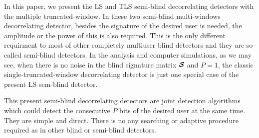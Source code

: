 \documentclass[a4paper,11pt,fleqn]{article}
\newcommand{\bcS}{{\mbox {\boldmath ${\cal S}$}}}
\begin{document}
In this paper, we present the LS and TLS semi-blind decorrelating
detectors with the multiple truncated-window. In these two
semi-blind multi-windows decorrelating detector, besides the
signature of the desired user is needed, the amplitude or the
power of this is also required. This is the only different
requirment to most of other completely multiuser blind detectors
and they are so-called semi-blind detectors. In the analysis and
computer simulations, as we may see, when there is no noise in the
blind signature matrix $\bcS$ and $P=1$, the classic
single-truncated-window decorrelating detector is just one special
case of the present LS sem-blind detector.

This present semi-blind decorrelating detectors are joint
detection algorithms which could detect the consecutive $P$ bits
of the desired user at the same time. They are simple and direct.
There is no any searching or adaptive procedure required as in
other blind or semi-blind detectors.



\end{document}
